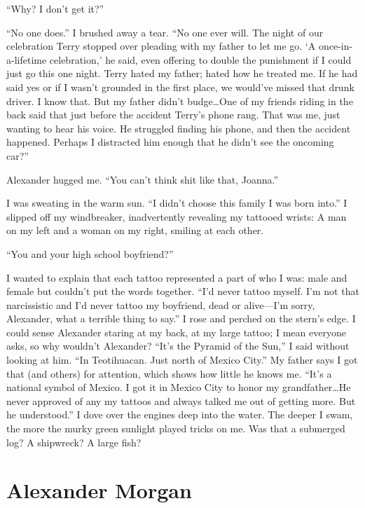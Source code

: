 ``Why? I don't get it?''

``No one does.'' I brushed away a tear. ``No one ever will. The night of
our celebration Terry stopped over pleading with my father to let me go.
`A once-in-a-lifetime celebration,' he said, even offering to double the
punishment if I could just go this one night. Terry hated my father;
hated how he treated me. If he had said yes or if I wasn't grounded in
the first place, we would've missed that drunk driver. I know that. But
my father didn't budge\ldots One of my friends riding in the back said
that just before the accident Terry's phone rang. That was me, just
wanting to hear his voice. He struggled finding his phone, and then the
accident happened. Perhaps I distracted him enough that he didn't see
the oncoming car?''

Alexander hugged me. ``You can't think shit like that, Joanna.''

I was sweating in the warm sun. ``I didn't choose this family I was born
into.'' I slipped off my windbreaker, inadvertently revealing my
tattooed wrists: A man on my left and a woman on my right, smiling at
each other.

``You and your high school boyfriend?''

I wanted to explain that each tattoo represented a part of who I was:
male and female but couldn't put the words together. ``I'd never tattoo
myself. I'm not that narcissistic and I'd never tattoo my boyfriend,
dead or alive---I'm sorry, Alexander, what a terrible thing to say.'' I
rose and perched on the stern's edge. I could sense Alexander staring at
my back, at my large tattoo; I mean everyone asks, so why wouldn't
Alexander? ``It's the Pyramid of the Sun,'' I said without looking at
him. ``In Teotihuacan. Just north of Mexico City.'' My father says I got
that (and others) for attention, which shows how little he knows me.
``It's a national symbol of Mexico. I got it in Mexico City to honor my
grandfather\ldots He never approved of any my tattoos and always talked
me out of getting more. But he understood.'' I dove over the engines
deep into the water. The deeper I swam, the more the murky green
sunlight played tricks on me. Was that a submerged log? A shipwreck? A
large fish?

\chapter{Alexander Morgan}

\titlemark

